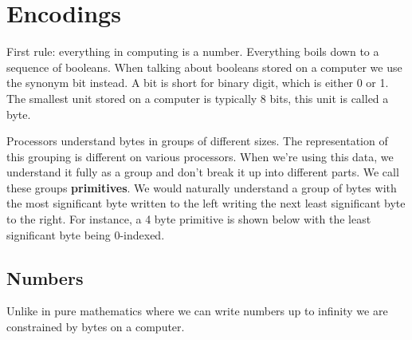 \chapter{Encodings}

First rule: everything in computing is a number. Everything boils down to a
sequence of booleans. When talking about booleans stored on a computer we use
the synonym bit instead. A bit is short for binary digit, which is either 0 or
1. The smallest unit stored on a computer is typically 8 bits, this unit is
called a byte.

Processors understand bytes in groups of different sizes. The representation of
this grouping is different on various processors. When we're using this data, we
understand it fully as a group and don't break it up into different parts. We
call these groups \textbf{primitives}. We would naturally understand a group of
bytes with the most significant byte written to the left writing the next least
significant byte to the right. For instance, a 4 byte primitive is shown below
with the least significant byte being 0-indexed.

\begin{center}
\end{center}

\section{Numbers}

Unlike in pure mathematics where we can write numbers up to infinity we are
constrained by bytes on a computer.

